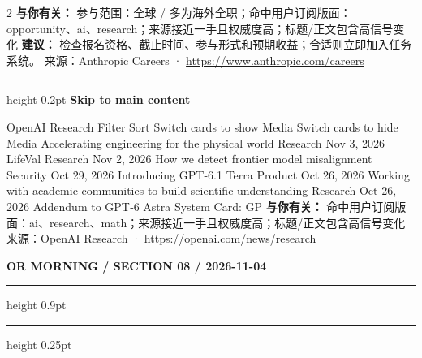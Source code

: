 \documentclass[10.5pt]{ctexart}
\begin{document}
\begin{multicols}{2}
\textbf{与你有关：} 参与范围：全球 / 多为海外全职；命中用户订阅版面：opportunity、ai、research；来源接近一手且权威度高；标题/正文包含高信号变化
\textbf{建议：} 检查报名资格、截止时间、参与形式和预期收益；合适则立即加入任务系统。
{\footnotesize\color{ormuted} 来源：Anthropic Careers · \url{https://www.anthropic.com/careers}}
\vspace{2mm}
\hrule height 0.2pt
\vspace{2mm}
{\large\bfseries Skip to main content}\par
OpenAI Research Filter Sort Switch cards to show Media Switch cards to hide Media Accelerating engineering for the physical world Research Nov 3, 2026 LifeVal Research Nov 2, 2026 How we detect frontier model misalignment Security Oct 29, 2026 Introducing GPT-6.1 Terra Product Oct 26, 2026 Working with academic communities to build scientific understanding Research Oct 26, 2026 Addendum to GPT‑6 Astra System Card: GP
\textbf{与你有关：} 命中用户订阅版面：ai、research、math；来源接近一手且权威度高；标题/正文包含高信号变化
{\footnotesize\color{ormuted} 来源：OpenAI Research · \url{https://openai.com/news/research}}
\end{multicols}
\newpage
{\small\bfseries OR MORNING / SECTION 08 / 2026-11-04}
\vspace{2mm}
\hrule height 0.9pt
\vspace{1.5mm}
\hrule height 0.25pt
\vspace{4mm}
\end{document}
